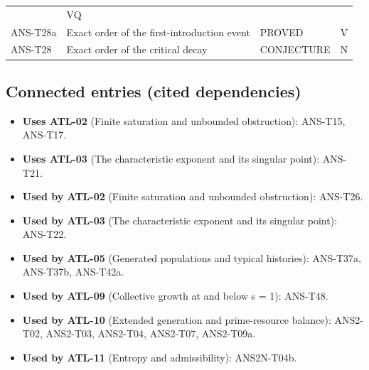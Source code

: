 \documentclass[
  11pt,
]{article}
\providecommand{\tightlist}{%
  \setlength{\itemsep}{0pt}\setlength{\parskip}{0pt}}
\begin{document}
\begin{longtable}[]{@{}llll@{}}
\begin{minipage}[t]{0.22\columnwidth}
\end{minipage} & \begin{minipage}[t]{0.10\columnwidth}\raggedright
VQ\strut
\end{minipage}\tabularnewline
\begin{minipage}[t]{0.16\columnwidth}\raggedright
ANS-T28a\strut
\end{minipage} & \begin{minipage}[t]{0.41\columnwidth}\raggedright
Exact order of the first-introduction event\strut
\end{minipage} & \begin{minipage}[t]{0.22\columnwidth}\raggedright
PROVED\strut
\end{minipage} & \begin{minipage}[t]{0.10\columnwidth}\raggedright
V\strut
\end{minipage}\tabularnewline
\begin{minipage}[t]{0.16\columnwidth}\raggedright
ANS-T28\strut
\end{minipage} & \begin{minipage}[t]{0.41\columnwidth}\raggedright
Exact order of the critical decay\strut
\end{minipage} & \begin{minipage}[t]{0.22\columnwidth}\raggedright
CONJECTURE\strut
\end{minipage} & \begin{minipage}[t]{0.10\columnwidth}\raggedright
N\strut
\end{minipage}\tabularnewline
\bottomrule
\end{longtable}

\hypertarget{connected-entries-cited-dependencies-3}{%
\subsection{Connected entries (cited
dependencies)}\label{connected-entries-cited-dependencies-3}}

\begin{itemize}
\tightlist
\item
  \textbf{Uses ATL-02} (Finite saturation and unbounded obstruction):
  ANS-T15, ANS-T17.
\item
  \textbf{Uses ATL-03} (The characteristic exponent and its singular
  point): ANS-T21.
\item
  \textbf{Used by ATL-02} (Finite saturation and unbounded obstruction):
  ANS-T26.
\item
  \textbf{Used by ATL-03} (The characteristic exponent and its singular
  point): ANS-T22.
\item
  \textbf{Used by ATL-05} (Generated populations and typical histories):
  ANS-T37a, ANS-T37b, ANS-T42a.
\item
  \textbf{Used by ATL-09} (Collective growth at and below s = 1):
  ANS-T48.
\item
  \textbf{Used by ATL-10} (Extended generation and prime-resource
  balance): ANS2-T02, ANS2-T03, ANS2-T04, ANS2-T07, ANS2-T09a.
\item
  \textbf{Used by ATL-11} (Entropy and admissibility): ANS2N-T04b.
\end{itemize}
\end{document}
